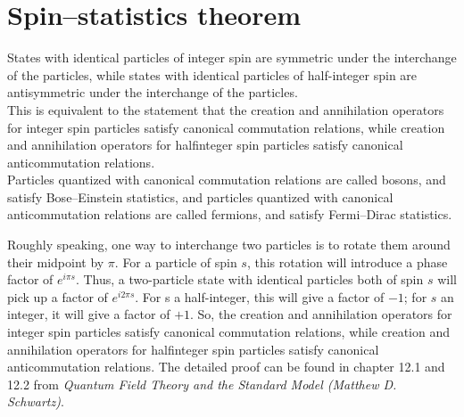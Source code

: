 \section{Spin–statistics theorem}
\begin{newthem}
States with identical particles of integer spin are symmetric under the interchange of the particles, while states with identical particles of half-integer spin are antisymmetric under the interchange of the particles. \\
This is equivalent to the statement that the creation and annihilation operators for integer spin particles satisfy canonical commutation relations, while creation and annihilation operators for halfinteger spin particles satisfy canonical anticommutation relations. \\
Particles quantized with canonical commutation relations are called bosons, and satisfy Bose–Einstein statistics, and particles quantized with canonical anticommutation relations are called fermions, and satisfy Fermi–Dirac statistics.
\end{newthem}
Roughly speaking,  one way to interchange two particles is to rotate them around their midpoint by $\pi$. For a particle of spin $s$, this rotation will introduce a phase factor of $e^{i\pi s}$. Thus, a two-particle state with identical particles both of spin $s$ will pick up a factor of $e^{i2\pi s}$. For s a half-integer, this will give a factor of $-1$; for $s$ an integer, it will give a factor of $+1$. So, the creation and annihilation operators for integer spin particles satisfy canonical commutation relations, while creation and annihilation operators for halfinteger spin particles satisfy canonical anticommutation relations. The detailed proof can be found in chapter 12.1 and 12.2 from \emph{Quantum Field Theory and the Standard Model (Matthew D. Schwartz)}.

